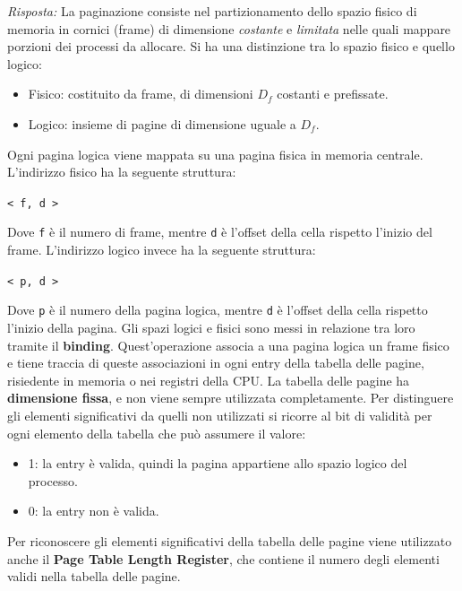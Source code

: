 \documentclass{article}
\newenvironment{solution}
    {\textit{Risposta:}}
    {}
\begin{document}
\begin{solution}
La paginazione consiste nel partizionamento dello spazio fisico di memoria in cornici (frame) di dimensione \textit{costante} e \textit{limitata} nelle quali mappare porzioni dei processi da allocare. Si ha una distinzione tra lo spazio fisico e quello logico:
\begin{itemize}
    \item Fisico: costituito da frame, di dimensioni $D_f$ costanti e prefissate.
    \item Logico: insieme di pagine di dimensione uguale a $D_f$.
\end{itemize}
Ogni pagina logica viene mappata su una pagina fisica in memoria centrale.
\newline
L’indirizzo fisico ha la seguente struttura:
\begin{center}
\texttt{< f, d >}
\end{center}
Dove \texttt{f} è il numero di frame, mentre \texttt{d} è l’offset della cella rispetto l’inizio del frame.
\newline
\newline
L’indirizzo logico invece ha la seguente struttura:
\begin{center}
\texttt{< p, d >}
\end{center}
Dove \texttt{p} è il numero della pagina logica, mentre \texttt{d} è l’offset della cella rispetto l’inizio della pagina.
Gli spazi logici e fisici sono messi in relazione tra loro tramite il \textbf{binding}.
\newline
Quest’operazione associa a una pagina logica un frame fisico e tiene traccia di queste associazioni in ogni entry della tabella delle pagine, risiedente in memoria o nei registri della CPU.
\newline
La tabella delle pagine ha \textbf{dimensione fissa}, e non viene sempre utilizzata completamente.
\newline
Per distinguere gli elementi significativi da quelli non utilizzati si ricorre al bit di validità per ogni elemento della tabella che può assumere il valore:
\begin{itemize}
    \item 1: la entry è valida, quindi la pagina appartiene allo spazio logico del processo.
    \item 0: la entry non è valida.
\end{itemize}
Per riconoscere gli elementi significativi della tabella delle pagine viene utilizzato anche il \textbf{Page Table Length Register}, che contiene il numero degli elementi validi nella tabella delle pagine.\newline

\end{solution}
\end{document}
